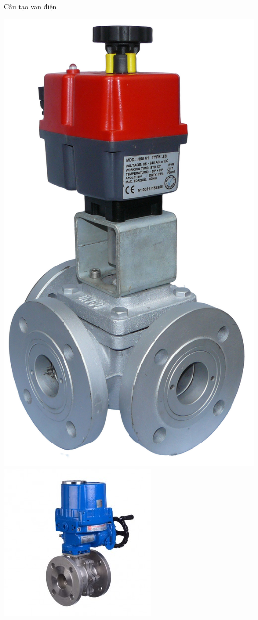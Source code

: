 \documentclass[20pt]{beamer}
\begin{document}
\begin{frame}{Cấu tạo van điện}
	\vspace{-.55cm}
	\begin{center}
		\includegraphics[scale=.09]{images/van-dien-3-nga.jpg} 
		\includegraphics[scale=.65]{images/van-dien-minh-hoa.jpg} 
	\end{center}
\end{frame}
\end{document}
